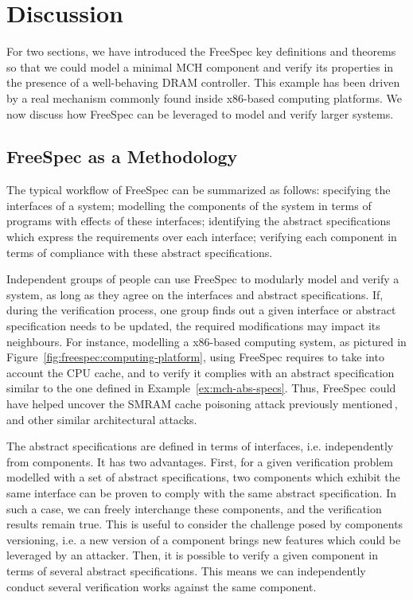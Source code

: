 \section{Discussion}
\label{sec:freespec:scale}

For two sections, we have introduced the FreeSpec key definitions and theorems
so that we could model a minimal MCH component and verify its properties in the
presence of a well-behaving DRAM controller.
%
This example has been driven by a real mechanism commonly found inside x86-based
computing platforms.
%
We now discuss how FreeSpec can be leveraged to model and verify larger systems.

\subsection{FreeSpec as a Methodology}

The typical workflow of FreeSpec can be summarized as follows: specifying the
interfaces of a system; modelling the components of the system in terms of
programs with effects of these interfaces; identifying the abstract
specifications which express the requirements over each interface; verifying
each component in terms of compliance with these abstract specifications.

Independent groups of people can use FreeSpec to modularly model and verify a
system, as long as they agree on the interfaces and abstract specifications.
%
If, during the verification process, one group finds out a given interface or
abstract specification needs to be updated, the required modifications may
impact its neighbours.
%
For instance, modelling a x86-based computing system, as pictured in
Figure~\ref{fig:freespec:computing-platform}, using FreeSpec requires to take
into account the CPU cache, and to verify it complies with an abstract
specification similar to the one defined in Example~\ref{ex:mch-abs-specs}.
%
Thus, FreeSpec could have helped uncover the SMRAM cache poisoning attack
previously mentioned\,\cite{wojtczuk2009smram,duflot2009smram}, and other
similar architectural attacks.

The abstract specifications are defined in terms of interfaces, i.e.
independently from components.
%
It has two advantages.
%
First, for a given verification problem modelled with a set of abstract
specifications, two components which exhibit the same interface can be proven to
comply with the same abstract specification.
%
In such a case, we can freely interchange these components, and the verification
results remain true.
%
This is useful to consider the challenge posed by components versioning, i.e. a
new version of a component brings new features which could be leveraged by an
attacker.
%
Then, it is possible to verify a given component in terms of several abstract
specifications.
%
This means we can independently conduct several verification works against the
same component.


